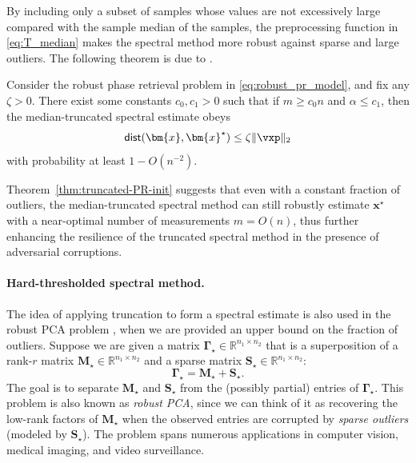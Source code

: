  By including only a subset of samples whose values are not excessively large compared with the sample median of the samples, the preprocessing function in \eqref{eq:T_median} makes the spectral method more robust against sparse and large outliers.
The following theorem is due to \cite{zhang2016provable}. 
\begin{theorem} 
	\label{thm:truncated-PR-init}
	Consider the robust phase retrieval problem in \eqref{eq:robust_pr_model}, and fix any $\zeta > 0$. There exist some constants  $c_0, c_1>0$ such that if 
$m\geq c_{0}n$ and $\alpha\leq c_1$, then the median-truncated spectral estimate obeys
\[
	\mathsf{dist}(\bm{x},\bm{x}^{\star})  \le \zeta \| \vxp \|_2
\]
with probability at least $1 - O(n^{-2})$.
\end{theorem}

Theorem~\ref{thm:truncated-PR-init} suggests that even with a constant fraction of outliers, the median-truncated spectral method can still robustly estimate $\bm{x}^{\star}$ with a near-optimal number of measurements $m=O(n)$, thus further enhancing the resilience of the truncated spectral method in the presence of adversarial corruptions.

\paragraph{Hard-thresholded spectral method.}
The idea of applying truncation to form a spectral estimate is also used in the robust PCA problem \citep{chandrasekaran2011siam,candes2009robustPCA,vaswani2017robust}, when we are provided an upper bound on the fraction of outliers. 
Suppose we are given a matrix $\bm{\Gamma}_{\star}\in\mathbb{R}^{n_1\times n_2}$ that is a superposition of a rank-$r$ matrix $\bm{M}_{\star}\in\mathbb{R}^{n_1\times n_2}$ and a sparse matrix $\bm{S}_{\star}\in\mathbb{R}^{n_1\times n_2}$:
%
\begin{equation}\label{eq:rpca_decomp}
\bm{\Gamma}_{\star} = \bm{M}_{\star} + \bm{S}_{\star}.
\end{equation}
%
The goal is to separate $\bm{M}_{\star}$ and $\bm{S}_{\star}$ from the (possibly partial) entries of $\bm{\Gamma}_{\star}$. This problem is also known as {\em robust PCA}, since we can think of it as recovering the low-rank factors of  $\bm{M}_{\star}$ when the observed entries are corrupted by {\em sparse outliers} (modeled by $\bm{S}_{\star}$). The problem spans numerous applications in computer vision, medical imaging, and video surveillance. 

